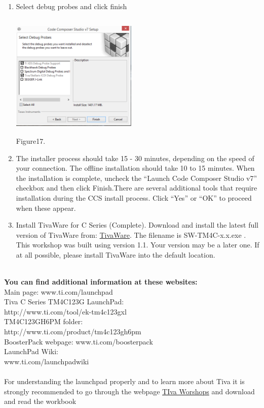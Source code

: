 \documentclass[a4paper,12pt,oneside]{book}
\begin{document}
\begin{itemize}
{\begin{enumerate}
\begin{center}
	\end{center}
	\item Select debug probes and click finish \\
	\begin{center}
		\includegraphics[width=6cm, height=6cm]{Images/CCSInstall4}\\
		Figure17.
	\end{center}
	\item The installer process	should take 15 - 30 minutes, depending on the speed of your connection. The offline
	installation should take 10 to 15 minutes. When the installation is complete, uncheck the
	“Launch Code Composer Studio v7” checkbox and then click Finish.There are several additional tools that require installation during the CCS install process. Click “Yes” or “OK” to proceed when these appear. \\
	\item Install TivaWare for C Series (Complete). Download and install the latest full version of TivaWare from: \href{http://www.ti.com/tool/sw-tm4c}{TivaWare}. The filename is SW-TM4C-x.x.exe . This
	workshop was built using version 1.1. Your version may be a later one. If at all possible,
	please install TivaWare into the default location.
\end{enumerate}}
{\textbf{\\You can find additional information at these websites:}\\
Main page: www.ti.com/launchpad\\
Tiva C Series TM4C123G LaunchPad:\\ http://www.ti.com/tool/ek-tm4c123gxl\\
TM4C123GH6PM folder:\\ http://www.ti.com/product/tm4c123gh6pm\\
BoosterPack webpage: www.ti.com/boosterpack\\
LaunchPad Wiki:\\ www.ti.com/launchpadwiki\\}	\\	
{For understanding the launchpad properly and to learn more about Tiva it is strongly recommended to go through the webpage \href{http://processors.wiki.ti.com/index.php/Getting_Started_with_the_TIVA\%E2\%84\%A2_C_Series_TM4C123G_LaunchPad}{TIva Worshops} and download and read the workbook }

\end{itemize}
\end{document}
